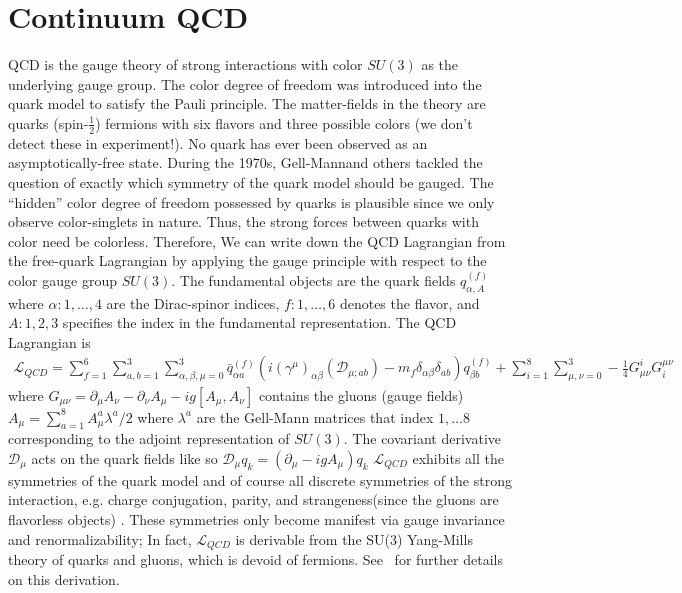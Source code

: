 \section{Continuum QCD}
QCD is the gauge theory of strong interactions with color $SU(3)$ as the underlying gauge group. The color degree of freedom was introduced into the quark model to satisfy the Pauli principle. The matter-fields in the theory are quarks (spin-$\frac{1}{2}$) fermions with six flavors and three possible colors (we don't detect these in experiment!). No quark has ever been observed as an asymptotically-free state. During the 1970s, Gell-Mann\cite{Gell-Mann:1964ewy}and others \cite{PhysRevD.8.3633}\cite{PhysRevLett.31.494} tackled the question of exactly which symmetry of the quark model should be gauged. The ``hidden'' color degree of freedom possessed by quarks is plausible since we only observe color-singlets in nature. Thus, the strong forces between quarks with color need be colorless. Therefore, We can write down the QCD Lagrangian from the free-quark Lagrangian by applying the gauge principle with respect to the color gauge group $SU(3)$. The fundamental objects are the quark fields  $q_{\alpha,A}^{(f)}$ where $\alpha: 1,\dots,4$ are the Dirac-spinor indices, $f: 1,\dots,6$ denotes the flavor, and  $A: 1,2,3$ specifies the  index in the fundamental representation. 
The QCD Lagrangian is 
\begin{align}
    \mathcal{L}_{QCD} = \sum_{f=1}^{6} \sum_{a,b=1}^{3} \sum_{\alpha,\beta,\mu=0}^{3} \bar{q}_{\alpha a}^{(f)}(i(\gamma^\mu)_{\alpha \beta}(\mathcal{D}_{\mu;ab}) - m_f\delta_{\alpha \beta}\delta_{ab}) q_{\beta b}^{(f)} + \sum_{i=1}^{8}\sum_{\mu,\nu=0}^{3} -\frac{1}{4} G_{\mu\nu}^i G_i^{\mu\nu}
\end{align}
where $G_{\mu\nu} = \partial_\mu A_\nu - \partial_\nu A_\mu - ig[A_\mu,A_\nu]$ contains the gluons (gauge fields) $A_\mu = \sum_{a=1}^{8}A_\mu^a \lambda^a/2$ where $\lambda^a$ are the Gell-Mann matrices that index $1,\dots 8$ corresponding to the adjoint representation of $SU(3)$. The covariant derivative $\mathcal D_\mu$ acts on the quark fields like so $\mathcal D_\mu q_k = (\partial_\mu - igA_\mu)q_k$ 
$\mathcal{L}_{QCD}$ exhibits all the symmetries of the quark model and of course all discrete symmetries of the strong interaction, e.g. charge conjugation, parity, and strangeness(since the gluons are flavorless objects) \cite{Cheng1984GaugeTO}. These symmetries only become manifest via gauge invariance and renormalizability; In fact, $\mathcal{L}_{QCD}$ is derivable from the SU(3) Yang-Mills theory of quarks and gluons, which is devoid of fermions. See~\cite{Cheng1984GaugeTO} for further details on this derivation. 

